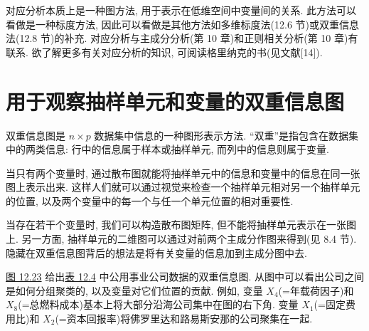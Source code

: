 

对应分析本质上是一种图方法, 用于表示在低维空间中变量间的关系. 此方法可以看做是一种标度方法, 因此可以看做是其他方法如多维标度法(12.6 节)或双重信息法(12.8 节)的补充. 对应分析与主成分分析(第 10 章)和正则相关分析(第 10 章)有联系. 欲了解更多有关对应分析的知识, 可阅读格里纳克的书(见文献[14]).

\section{用于观察抽样单元和变量的双重信息图}
\label{sec:12.8}

双重信息图是 $n\times p$ 数据集中信息的一种图形表示方法. “双重”是指包含在数据集中的两类信息: 行中的信息属于样本或抽样单元, 而列中的信息则属于变量.

当只有两个变量时, 通过散布图就能将抽样单元中的信息和变量中的信息在同一张图上表示出来. 这样人们就可以通过视觉来检查一个抽样单元相对另一个抽样单元的位置, 以及两个变量中的每一个与任一个单元位置的相对重要性.

当存在若干个变量时, 我们可以构造散布图矩阵, 但不能将抽样单元表示在一张图上. 另一方面, 抽样单元的二维图可以通过对前两个主成分作图来得到(见 8.4 节). 隐藏在双重信息图背后的想法是将有关变量的信息加到主成分图中去.

\hyperref[fig:12.23]{图 12.23} 给出\hyperref[tab:12.4]{表 12.4} 中公用事业公司数据的双重信息图. 从图中可以看出公司之间是如何分组聚类的, 以及变量对它们位置的贡献. 例如, 变量 $X_4$(=年载荷因子)和 $X_8$(=总燃料成本)基本上将大部分沿海公司集中在图的右下角. 变量 $X_1$(=固定费用比)和 $X_2$(=资本回报率)将佛罗里达和路易斯安那的公司聚集在一起.

\begin{mvfigure}
\label{fig:12.23}
\end{mvfigure}
